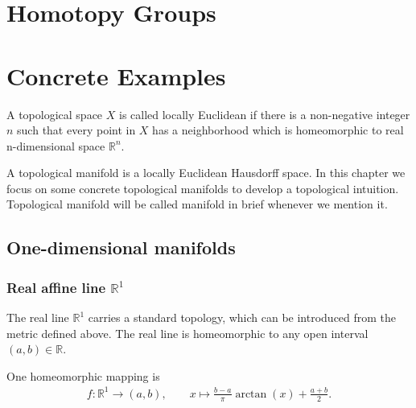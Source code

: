 \documentclass{report}
\begin{document}
\chapter{Homotopy Groups}




\chapter{Concrete Examples}
A topological space $X$ is called locally Euclidean if there is a non-negative integer $n$ such that every point in $X$ has a neighborhood which is homeomorphic to real n-dimensional space $\mathbb{R}^n$.

\indent A topological manifold is a locally Euclidean Hausdorff space. In this chapter we focus on some concrete topological manifolds to develop a topological intuition. Topological manifold will be called manifold in brief whenever we mention it.

\section{One-dimensional manifolds}
\subsection{Real affine line $\mathbb{R}^1$}
The real line $\mathbb{R}^1$ carries a standard topology, which can be introduced from the metric defined above. The real line is homeomorphic to any open interval $(a, b)\in\mathbb{R}$.
\begin{center}
\end{center}
One homeomorphic mapping is
\begin{align*}
	f:\mathbb{R}^1\longrightarrow(a, b),\qquad
	x\longmapsto \frac{b-a}{\pi}\arctan\left(x\right)+\frac{a+b}{2}.
\end{align*}
\end{document}
